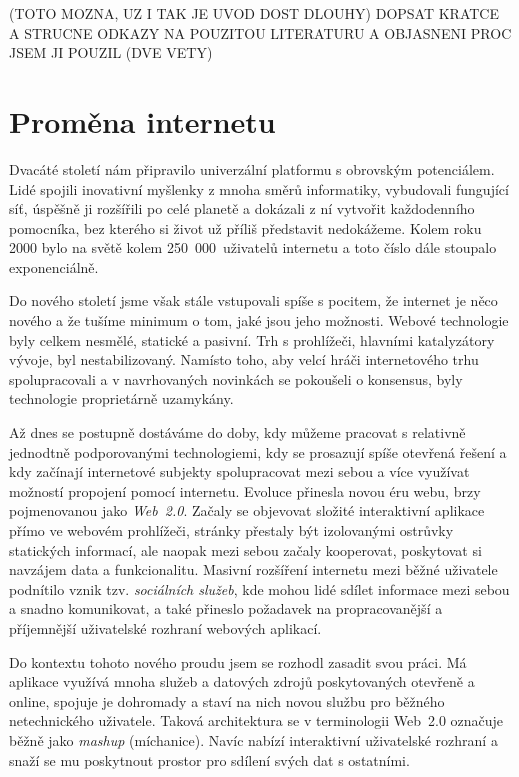 (TOTO MOZNA, UZ I TAK JE UVOD DOST DLOUHY) DOPSAT KRATCE A STRUCNE
ODKAZY NA POUZITOU LITERATURU A OBJASNENI PROC JSEM JI POUZIL (DVE VETY)

\chapter{Proměna internetu}

Dvacáté století nám připravilo univerzální platformu s obrovským
potenciálem. Lidé spojili inovativní myšlenky z mnoha směrů informatiky,
vybudovali fungující síť, úspěšně ji rozšířili po celé planetě
a dokázali z ní vytvořit každodenního pomocníka, bez kterého si život
už příliš představit nedokážeme. Kolem roku 2000 bylo na světě kolem
250~000~uživatelů internetu a toto číslo dále stoupalo exponenciálně.

Do nového století jsme však stále vstupovali spíše s pocitem, že
internet je něco nového a že tušíme minimum o tom, jaké jsou jeho
možnosti. Webové technologie byly celkem nesmělé, statické a pasivní.
Trh s prohlížeči, hlavními katalyzátory vývoje, byl nestabilizovaný.
Namísto toho, aby velcí hráči internetového trhu spolupracovali a v
navrhovaných novinkách se pokoušeli o konsensus, byly technologie
proprietárně uzamykány.

Až dnes se postupně dostáváme do doby, kdy můžeme pracovat s
relativně jednodtně podporovanými technologiemi, kdy se prosazují
spíše otevřená řešení a kdy začínají internetové subjekty
spolupracovat mezi sebou a více využívat možností propojení pomocí
internetu. Evoluce přinesla novou éru webu, brzy pojmenovanou jako
{\it Web~2.0}. Začaly se objevovat složité interaktivní aplikace přímo
ve webovém prohlížeči, stránky přestaly být izolovanými ostrůvky
statických informací, ale naopak mezi sebou začaly kooperovat,
poskytovat si navzájem data a funkcionalitu. Masivní rozšíření
internetu mezi běžné uživatele podnítilo vznik tzv. {\it sociálních
služeb}, kde mohou lidé sdílet informace mezi sebou a snadno
komunikovat, a také přineslo požadavek na propracovanější a
příjemnější uživatelské rozhraní webových aplikací.

Do kontextu tohoto nového proudu jsem se rozhodl zasadit svou práci.
Má aplikace využívá mnoha služeb a datových zdrojů
poskytovaných otevřeně a online, spojuje je dohromady a staví na nich
novou službu pro běžného netechnického uživatele. Taková architektura
se v terminologii Web~2.0 označuje běžně jako {\it mashup}
(míchanice). Navíc nabízí interaktivní uživatelské rozhraní a snaží
se mu poskytnout prostor pro sdílení svých dat s ostatními.

